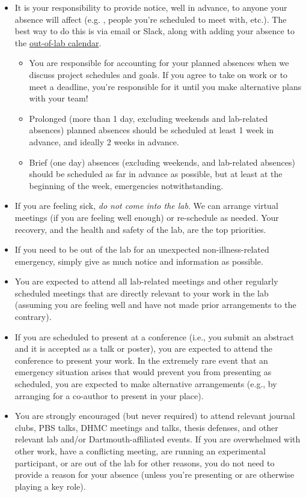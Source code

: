 \documentclass{tufte-book} %
\begin{document}
\begin{itemize}
\item It is your responsibility to provide notice, well in advance, to
  anyone your absence will affect (e.g. \director, people you're
  scheduled to meet with, etc.).  The best way to do this is via email
  or Slack, along with adding your absence to the
  \hyperref[sec: scheduling]{out-of-lab calendar}.
\begin{itemize}
\item You are responsible for accounting for your planned absences
  when we discuss project schedules and goals.  If you agree to take
  on work or to meet a deadline, you're responsible for it until you
  make alternative plans with your team!
\item Prolonged (more than 1 day, excluding weekends and
  lab-related absences) planned
  absences should be scheduled at least 1 week in advance, and ideally
  2 weeks in advance.
\item Brief (one day) absences (excluding weekends, and lab-related
  absences) should be scheduled as far in advance as possible, but at
  least at the beginning of the week, emergencies notwithstanding.
\end{itemize}

\item If you are feeling sick, \textit{do not come into the lab}.  We
  can arrange virtual meetings (if you are feeling well enough) or
  re-schedule as needed.  Your recovery, and the health and safety of
  the lab, are the top priorities.

\item If you need to be out of the lab for an unexpected
  non-illness-related emergency, simply give as much notice and
  information as possible.

\item You are expected to attend all lab-related meetings and other regularly
  scheduled meetings that are directly relevant to your work in the
  lab (assuming you are feeling well and have not made prior arrangements to the contrary).

\item If you are scheduled to present at a conference (i.e., you
  submit an abstract and it is accepted as a talk or poster), you are
  expected to attend the conference to present your work.  In the
  extremely rare event that an emergency situation arises that would
  prevent you from presenting as scheduled, you are expected to make
  alternative arrangements (e.g., by arranging for a co-author to
  present in your place).

\item You are strongly encouraged (but never required) to attend
  relevant journal clubs, PBS talks, DHMC meetings and talks, thesis
  defenses, and other relevant lab and/or Dartmouth-affiliated events.
  If you are overwhelmed with other work, have a conflicting meeting,
  are running an experimental participant, or are out of the lab for
  other reasons, you do not need to provide a reason for your absence
  (unless you're presenting or are otherwise playing a key role).
\end{itemize}
\end{document}
